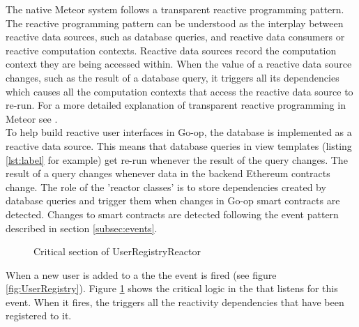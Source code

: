 The native Meteor system follows a transparent reactive programming pattern. The reactive programming pattern can be understood as the interplay between reactive data sources, such as database queries, and reactive data consumers or reactive computation contexts. Reactive data sources record the computation context they are being accessed within. When the value of a reactive data source changes, such as the result of a database query, it triggers all its dependencies which causes all the computation contexts that access the reactive data source to re-run. For a more detailed explanation of transparent reactive programming in Meteor see \cite{Tracker}.\\

To help build reactive user interfaces in Go-op, the database is implemented as a reactive data source. This means that database queries in view templates (listing \ref{lst:label} for example) get re-run whenever the result of the query changes. The result of a query changes whenever data in the backend Ethereum contracts change. The role of the 'reactor classes' is to store dependencies created by database queries and trigger them when changes in Go-op smart contracts are detected. Changes to smart contracts are detected following the event pattern described in section \ref{subsec:events}. \\

\begin{figure}
\centering
{}
\decoRule
\caption[Critical Section In UserRegistryReactor]{Critical section of UserRegistryReactor}
\label{fig:UserRegistryReactor}
\end{figure}

When a new user is added to a the  the  event is fired (see figure \ref{fig:UserRegistry}). Figure \ref{fig:UserRegistryReactor} shows the critical logic in the  that listens for this event. When it fires, the  triggers all the reactivity dependencies that have been registered to it. \\

